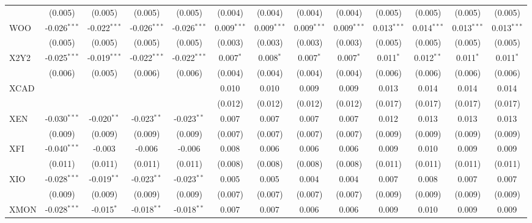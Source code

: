 \begin{table}[!htbp]
\begin{tabular}{@{\extracolsep{5pt}}lcccccccccccc}
  & (0.005) & (0.005) & (0.005) & (0.005) & (0.004) & (0.004) & (0.004) & (0.004) & (0.005) & (0.005) & (0.005) & (0.005) \\
 WOO & -0.026$^{***}$ & -0.022$^{***}$ & -0.026$^{***}$ & -0.026$^{***}$ & 0.009$^{***}$ & 0.009$^{***}$ & 0.009$^{***}$ & 0.009$^{***}$ & 0.013$^{***}$ & 0.014$^{***}$ & 0.013$^{***}$ & 0.013$^{***}$ \\
  & (0.005) & (0.005) & (0.005) & (0.005) & (0.003) & (0.003) & (0.003) & (0.003) & (0.005) & (0.005) & (0.005) & (0.005) \\
 X2Y2 & -0.025$^{***}$ & -0.019$^{***}$ & -0.022$^{***}$ & -0.022$^{***}$ & 0.007$^{*}$ & 0.008$^{*}$ & 0.007$^{*}$ & 0.007$^{*}$ & 0.011$^{*}$ & 0.012$^{**}$ & 0.011$^{*}$ & 0.011$^{*}$ \\
  & (0.006) & (0.005) & (0.006) & (0.006) & (0.004) & (0.004) & (0.004) & (0.004) & (0.006) & (0.006) & (0.006) & (0.006) \\
 XCAD & & & & & 0.010$^{}$ & 0.010$^{}$ & 0.009$^{}$ & 0.009$^{}$ & 0.013$^{}$ & 0.014$^{}$ & 0.014$^{}$ & 0.014$^{}$ \\
  & & & & & (0.012) & (0.012) & (0.012) & (0.012) & (0.017) & (0.017) & (0.017) & (0.017) \\
 XEN & -0.030$^{***}$ & -0.020$^{**}$ & -0.023$^{**}$ & -0.023$^{**}$ & 0.007$^{}$ & 0.007$^{}$ & 0.007$^{}$ & 0.007$^{}$ & 0.012$^{}$ & 0.013$^{}$ & 0.013$^{}$ & 0.013$^{}$ \\
  & (0.009) & (0.009) & (0.009) & (0.009) & (0.007) & (0.007) & (0.007) & (0.007) & (0.009) & (0.009) & (0.009) & (0.009) \\
 XFI & -0.040$^{***}$ & -0.003$^{}$ & -0.006$^{}$ & -0.006$^{}$ & 0.008$^{}$ & 0.006$^{}$ & 0.006$^{}$ & 0.006$^{}$ & 0.009$^{}$ & 0.010$^{}$ & 0.009$^{}$ & 0.009$^{}$ \\
  & (0.011) & (0.011) & (0.011) & (0.011) & (0.008) & (0.008) & (0.008) & (0.008) & (0.011) & (0.011) & (0.011) & (0.011) \\
 XIO & -0.028$^{***}$ & -0.019$^{**}$ & -0.023$^{**}$ & -0.023$^{**}$ & 0.005$^{}$ & 0.005$^{}$ & 0.004$^{}$ & 0.004$^{}$ & 0.007$^{}$ & 0.008$^{}$ & 0.007$^{}$ & 0.007$^{}$ \\
  & (0.009) & (0.009) & (0.009) & (0.009) & (0.007) & (0.007) & (0.007) & (0.007) & (0.009) & (0.009) & (0.009) & (0.009) \\
 XMON & -0.028$^{***}$ & -0.015$^{*}$ & -0.018$^{**}$ & -0.018$^{**}$ & 0.007$^{}$ & 0.007$^{}$ & 0.006$^{}$ & 0.006$^{}$ & 0.009$^{}$ & 0.010$^{}$ & 0.009$^{}$ & 0.009$^{}$ \\

\end{tabular}
\end{table}
